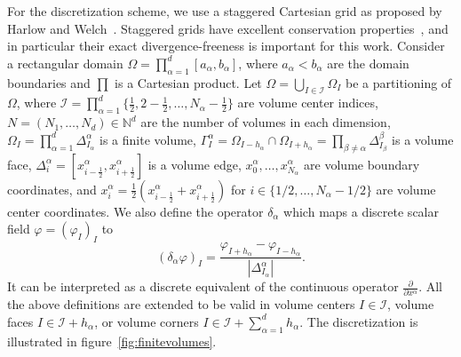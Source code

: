 \documentclass[preprint]{elsarticle}
\begin{document}
For the discretization scheme, we use a staggered Cartesian grid as proposed by
Harlow and Welch~\cite{Harlow1965}. Staggered grids have excellent conservation
properties~\cite{Lilly1965,Perot2011}, and in particular their exact
divergence-freeness is important for this work. Consider a rectangular domain
$\Omega = \prod_{\alpha = 1}^d [a_\alpha, b_\alpha]$, where $a_\alpha <
b_\alpha$ are the domain boundaries and $\prod$ is a Cartesian product. Let
$\Omega = \bigcup_{I \in \mathcal{I}} \Omega_I$ be a partitioning of $\Omega$,
where $\mathcal{I} = \prod_{\alpha = 1}^d \{ \frac{1}{2}, 2 - \frac{1}{2},
\dots, N_\alpha - \frac{1}{2} \}$ are volume center indices, $N = (N_1, \dots,
N_d) \in \mathbb{N}^d$ are the number of volumes in each dimension,
$\Omega_I = \prod_{\alpha = 1}^d \Delta^\alpha_{I_\alpha}$ is a finite
volume, $\Gamma^\alpha_I = \Omega_{I - h_\alpha} \cap \Omega_{I + h_\alpha} =
\prod_{\beta \neq \alpha} \Delta^\beta_{I_\beta}$ is a volume face,
$\Delta^\alpha_i = \left[ x^\alpha_{i - \frac{1}{2}}, x^\alpha_{i + \frac{1}{2}}
\right]$ is a volume edge, $x^\alpha_0, \dots, x^\alpha_{N_\alpha}$ are volume
boundary coordinates, and $x^\alpha_i = \frac{1}{2} \left(x^\alpha_{i -
\frac{1}{2}} + x^\alpha_{i + \frac{1}{2}}\right)$ for $i \in \{ 1 / 2, \dots,
N_\alpha - 1 / 2\}$ are volume center coordinates. We also define the operator
$\delta_\alpha$ which maps a discrete scalar field $\varphi = (\varphi_I)_I$ to
\begin{equation}
    (\delta_\alpha \varphi)_I = \frac{\varphi_{I + h_\alpha} - \varphi_{I -
    h_\alpha}}{| \Delta^\alpha_{I_\alpha} |}.
\end{equation}
It can be interpreted as a discrete equivalent of the continuous operator
$\frac{\partial}{\partial x^\alpha}$. All the above definitions are extended to
be valid in volume centers $I \in \mathcal{I}$, volume faces $I \in \mathcal{I}
+ h_\alpha$, or volume corners $I \in \mathcal{I} + \sum_{\alpha = 1}^d
h_\alpha$. The discretization is illustrated in figure~\ref{fig:finitevolumes}.
\end{document}
